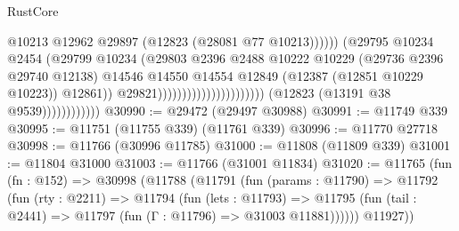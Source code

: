 \begin{lexlean}{RustCore}
\begin{coremodule}
                                                                          @10213
                                                                          @12962
                                                                          @29897
                                                                          (@12823
                                                                            (@28081 @77 @10213))))))
                                                                  (@29795
                                                                    @10234
                                                                    @2454
                                                                    (@29799
                                                                      @10234
                                                                      (@29803
                                                                        @2396
                                                                        @2488
                                                                        @10222
                                                                        @10229
                                                                        (@29736 @2396 @29740 @12138)
                                                                        @14546
                                                                        @14550
                                                                        @14554
                                                                        @12849
                                                                        (@12387
                                                                          (@12851 @10229 @10223))
                                                                        @12861))
                                                                    @29821))))))))))))))))))))))
                        (@12823 (@13191 @38 @9539))))))))))))
@30990 := @29472 (@29497 @30988)
@30991 := @11749 @339
@30995 := @11751 (@11755 @339) (@11761 @339)
@30996 := @11770 @27718
@30998 := @11766 (@30996 @11785)
@31000 := @11808 (@11809 @339)
@31001 := @11804 @31000
@31003 := @11766 (@31001 @11834)
@31020 := @11765
    (fun (fn : @152) =>
    @30998
      (@11788
        (@11791
          (fun (params : @11790) =>
          @11792
            (fun (rty : @2211) =>
            @11794
              (fun (lets : @11793) =>
              @11795 (fun (tail : @2441) => @11797 (fun (Γ : @11796) => @31003 @11881))))))
        @11927))

\end{coremodule}
\end{lexlean}

